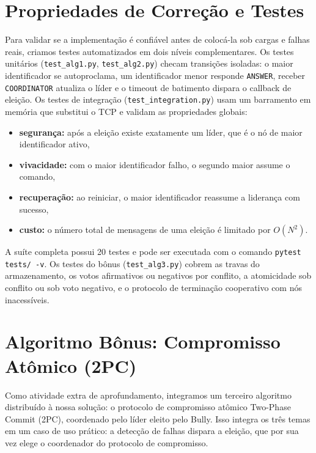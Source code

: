\documentclass[journal]{IEEEtran}
\begin{document}
\section{Propriedades de Correção e Testes}
Para validar se a implementação é confiável antes de colocá-la sob cargas e falhas reais, criamos testes automatizados em dois níveis complementares. Os testes unitários (\texttt{test\_alg1.py}, \texttt{test\_alg2.py}) checam transições isoladas: o maior identificador se autoproclama, um identificador menor responde \texttt{ANSWER}, receber \texttt{COORDINATOR} atualiza o líder e o timeout de batimento dispara o callback de eleição. Os testes de integração (\texttt{test\_integration.py}) usam um barramento em memória que substitui o TCP e validam as propriedades globais:
\begin{itemize}
    \item \textbf{segurança:} após a eleição existe exatamente um líder, que é o nó de maior identificador ativo,
    \item \textbf{vivacidade:} com o maior identificador falho, o segundo maior assume o comando,
    \item \textbf{recuperação:} ao reiniciar, o maior identificador reassume a liderança com sucesso,
    \item \textbf{custo:} o número total de mensagens de uma eleição é limitado por $O(N^2)$.
\end{itemize}
A suíte completa possui 20 testes e pode ser executada com o comando \texttt{pytest tests/ -v}. Os testes do bônus (\texttt{test\_alg3.py}) cobrem as travas do armazenamento, os votos afirmativos ou negativos por conflito, a atomicidade sob conflito ou sob voto negativo, e o protocolo de terminação cooperativo com nós inacessíveis.

\section{Algoritmo Bônus: Compromisso Atômico (2PC)}
Como atividade extra de aprofundamento, integramos um terceiro algoritmo distribuído à nossa solução: o protocolo de compromisso atômico Two-Phase Commit (2PC), coordenado pelo líder eleito pelo Bully. Isso integra os três temas em um caso de uso prático: a detecção de falhas dispara a eleição, que por sua vez elege o coordenador do protocolo de compromisso.
\end{document}
